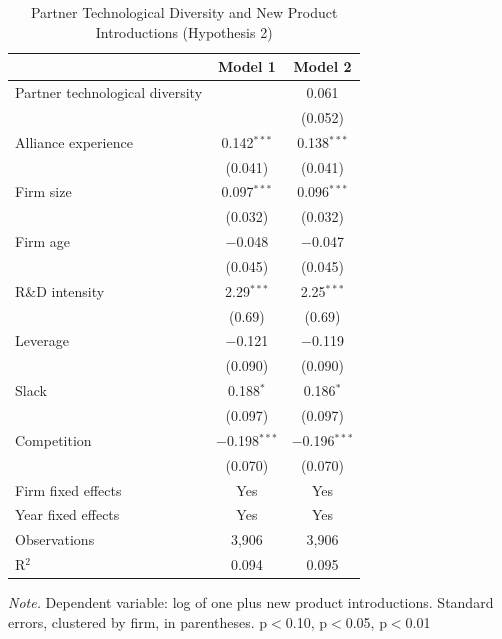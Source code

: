 \documentclass[12pt]{article}
\begin{document}
\begin{table}[p]
\centering\small
\caption{Partner Technological Diversity and New Product Introductions (Hypothesis 2)}
\begin{tabular}{lcc}
\toprule
 & Model 1 & Model 2 \\
\midrule
Partner technological diversity &  & 0.061 \\
 &  & (0.052) \\[2pt]
Alliance experience & 0.142$^{***}$ & 0.138$^{***}$ \\
 & (0.041) & (0.041) \\[2pt]
Firm size & 0.097$^{***}$ & 0.096$^{***}$ \\
 & (0.032) & (0.032) \\[2pt]
Firm age & $-$0.048 & $-$0.047 \\
 & (0.045) & (0.045) \\[2pt]
R\&D intensity & 2.29$^{***}$ & 2.25$^{***}$ \\
 & (0.69) & (0.69) \\[2pt]
Leverage & $-$0.121 & $-$0.119 \\
 & (0.090) & (0.090) \\[2pt]
Slack & 0.188$^{*}$ & 0.186$^{*}$ \\
 & (0.097) & (0.097) \\[2pt]
Competition & $-$0.198$^{***}$ & $-$0.196$^{***}$ \\
 & (0.070) & (0.070) \\[2pt]
\midrule
Firm fixed effects & Yes & Yes \\
Year fixed effects & Yes & Yes \\
Observations & 3,906 & 3,906 \\
R$^2$ & 0.094 & 0.095 \\
\bottomrule
\end{tabular}
\begin{minipage}{0.92\textwidth}\footnotesize\smallskip
\textit{Note.} Dependent variable: log of one plus new product introductions. Standard errors, clustered by firm, in parentheses. \textasteriskcentered{} p$<$0.10, \textasteriskcentered{}\textasteriskcentered{} p$<$0.05, \textasteriskcentered{}\textasteriskcentered{}\textasteriskcentered{} p$<$0.01
\end{minipage}
\end{table}
\clearpage
\end{document}

